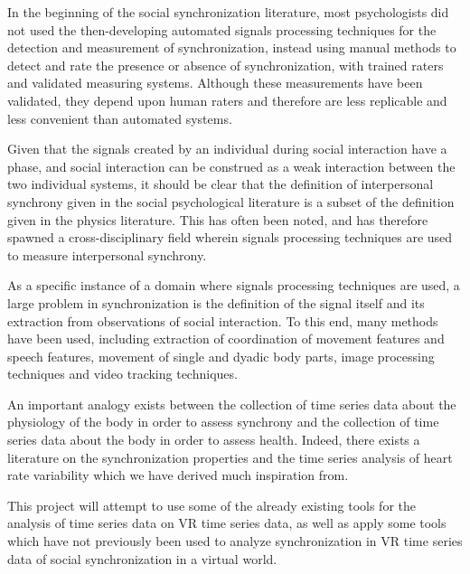 \documentclass[12pt]{article}
\begin{document}
In the beginning of the social synchronization literature, most psychologists did not used the then-developing automated signals processing techniques for the detection and measurement of synchronization, instead using manual methods to detect and rate the presence or absence of synchronization, with trained raters and validated measuring systems. Although these measurements have been validated, they depend upon human raters and therefore are less replicable and less convenient than automated systems. %

Given that the signals created by an individual during social interaction have a phase, and social interaction can be construed as a weak interaction between the two individual systems, it should be clear that the definition of interpersonal synchrony given in the social psychological literature is a subset of the definition given in the physics literature. This has often been noted, and has therefore spawned a cross-disciplinary field wherein signals processing techniques are used to measure interpersonal synchrony. %

As a specific instance of a domain where signals processing techniques are used, a large problem in synchronization is the definition of the signal itself and its extraction from observations of social interaction. To this end, many methods have been used, including extraction of coordination of movement features and speech features, movement of single and dyadic body parts, image processing techniques and video tracking techniques. %

An important analogy exists between the collection of time series data about the physiology of the body in order to assess synchrony and the collection of time series data about the body in order to assess health. Indeed, there exists a literature on the synchronization properties and the time series analysis of heart rate variability which we have derived much inspiration from. %



This project will attempt to use some of the already existing tools for the analysis of time series data on VR time series data, as well as apply some tools which have not previously been used to analyze synchronization in VR time series data of social synchronization in a virtual world.
\end{document}
